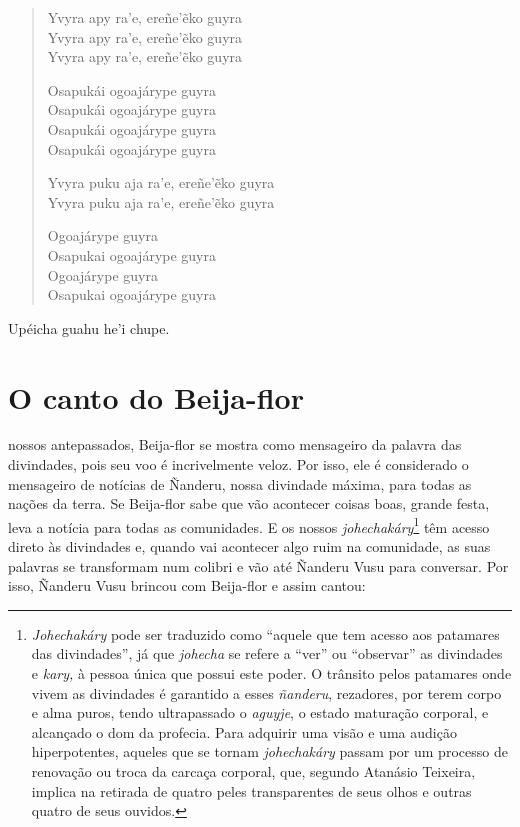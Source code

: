 \begin{verse}
Yvyra apy ra'e, ereñe'ẽko guyra\\
Yvyra apy ra'e, ereñe'ẽko guyra\\
Yvyra apy ra'e, ereñe'ẽko guyra

Osapukái ogoajárype guyra\\
Osapukái ogoajárype guyra\\
Osapukái ogoajárype guyra\\
Osapukái ogoajárype guyra

Yvyra puku aja ra'e, ereñe'ẽko guyra\\
Yvyra puku aja ra'e, ereñe'ẽko guyra

Ogoajárype guyra\\
Osapukai ogoajárype guyra\\
Ogoajárype guyra\\
Osapukai ogoajárype guyra
\end{verse}

Upéicha guahu he'i chupe.

\chapter{O canto do Beija-flor}

 nossos antepassados, Beija-flor se mostra como mensageiro da
palavra das divindades, pois seu voo é incrivelmente veloz. Por isso,
ele é considerado o mensageiro de notícias de Ñanderu, nossa divindade
máxima, para todas as nações da terra. Se Beija-flor sabe que vão
acontecer coisas boas, grande festa, leva a notícia para todas as
comunidades. E os nossos \emph{johechakáry}\footnote{\emph{Johechakáry}
  pode ser traduzido como ``aquele que tem acesso aos patamares das
  divindades'', já que \emph{johecha} se refere a ``ver'' ou
  ``observar'' as divindades e \emph{kary,} à pessoa única que possui
  este poder. O trânsito pelos patamares onde vivem as divindades é
  garantido a esses \emph{ñanderu}, rezadores, por terem corpo e alma
  puros, tendo ultrapassado o \emph{aguyje}, o estado maturação
  corporal, e alcançado o dom da profecia. Para adquirir uma visão e uma
  audição hiperpotentes, aqueles que se tornam \emph{johechakáry} passam
  por um processo de renovação ou troca da carcaça corporal, que,
  segundo Atanásio Teixeira, implica na retirada de quatro peles
  transparentes de seus olhos e outras quatro de seus ouvidos.} têm
acesso direto às divindades e, quando vai acontecer algo ruim na
comunidade, as suas palavras se transformam num colibri e vão até
Ñanderu Vusu para conversar. Por isso, Ñanderu Vusu brincou com
Beija-flor e assim cantou:

